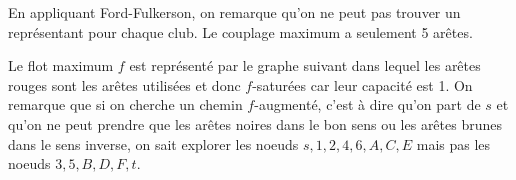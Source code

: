 \begin{solution}
  En appliquant Ford-Fulkerson, on remarque qu'on
  ne peut pas trouver un représentant pour chaque club.
  Le couplage maximum a seulement 5 arêtes.

  Le flot maximum $f$ est représenté par le graphe suivant dans lequel les arêtes rouges sont
  les arêtes utilisées et donc $f$-saturées car leur capacité est 1.
  On remarque que si on cherche un chemin $f$-augmenté,
  c'est à dire qu'on part de $s$ et qu'on ne peut prendre que les arêtes noires
  dans le bon sens ou les arêtes brunes dans le sens inverse,
  on sait explorer les noeuds $s,1,2,4,6,A,C,E$ mais pas les noeuds $3,5,B,D,F,t$.
  \begin{center}
  \end{center}
\end{solution}
